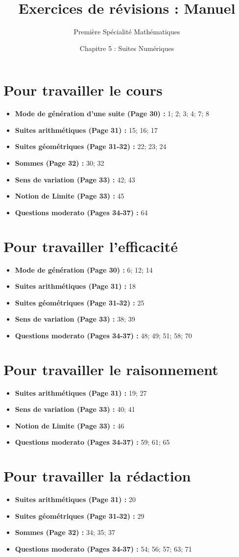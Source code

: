 \documentclass{poly}
\title{Exercices de révisions : Manuel}
\author{Première Spécialité Mathématiques}
\date{Chapitre 5 : Suites Numériques}
\begin{document}
\maketitle

\section{Pour travailler le cours}

\begin{itemize}
\item \textbf{Mode de génération d'une suite (Page 30) :}  1; 2; 3; 4; 7; 8
\item \textbf{Suites arithmétiques (Page 31) :} 15; 16; 17 
\item \textbf{Suites géométriques (Page 31-32) :} 22; 23; 24
\item \textbf{Sommes (Page 32) :} 30; 32
\item \textbf{Sens de variation (Page 33) :} 42; 43
\item \textbf{Notion de Limite (Page 33) :} 45
\item \textbf{Questions moderato (Pages 34-37) :} 64
\end{itemize}
\section{Pour travailler l'efficacité}

\begin{itemize}
\item \textbf{Mode de génération (Page 30) :}  6; 12; 14
\item \textbf{Suites arithmétiques (Page 31) :}  18
\item \textbf{Suites géométriques (Page 31-32) :} 25
\item \textbf{Sens de variation (Page 33) :} 38; 39
\item \textbf{Questions moderato (Pages 34-37) :} 48; 49; 51; 58; 70
\end{itemize}

\section{Pour travailler le raisonnement}

\begin{itemize}
\item \textbf{Suites arithmétiques (Page 31) :} 19; 27
\item \textbf{Sens de variation (Page 33) :} 40; 41
\item \textbf{Notion de Limite (Page 33) :} 46
\item \textbf{Questions moderato (Pages 34-37) :} 59; 61; 65
\end{itemize}

\section{Pour travailler la rédaction}
\begin{itemize}
\item \textbf{Suites arithmétiques (Page 31) :} 20
\item \textbf{Suites géométriques (Page 31-32) :} 29
\item \textbf{Sommes (Page 32) :} 34; 35; 37
\item \textbf{Questions moderato (Pages 34-37) :} 54; 56; 57; 63; 71
\end{itemize}
\end{document}
